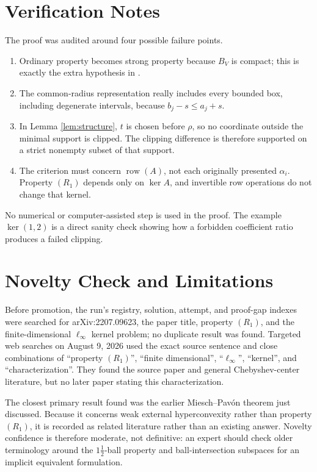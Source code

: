 \documentclass[11pt]{article}
\theoremstyle{definition}
\newcommand{\row}{\operatorname{row}}
\begin{document}
\section{Verification Notes}

The proof was audited around four possible failure points.
\begin{enumerate}
\item Ordinary property becomes strong property because \(B_V\) is compact;
      this is exactly the extra hypothesis in \cite[Theorem 1.4]{DasPaul}.
\item The common-radius representation really includes every bounded box,
      including degenerate intervals, because \(b_j-s\le a_j+s\).
\item In Lemma \ref{lem:structure}, \(t\) is chosen before \(\rho\), so no
      coordinate outside the minimal support is clipped.  The clipping
      difference is therefore supported on a strict nonempty subset of that
      support.
\item The criterion must concern \(\row(A)\), not each originally presented
      \(\alpha_i\).  Property \((R_1)\) depends only on \(\ker A\), and
      invertible row operations do not change that kernel.
\end{enumerate}
No numerical or computer-assisted step is used in the proof.  The example
\(\ker(1,2)\) is a direct sanity check showing how a forbidden coefficient
ratio produces a failed clipping.

\section{Novelty Check and Limitations}

Before promotion, the run's registry, solution, attempt, and proof-gap indexes
were searched for arXiv:2207.09623, the paper title, property \((R_1)\), and
the finite-dimensional \(\ell_\infty\) kernel problem; no duplicate result was
found.  Targeted web searches on August 9, 2026 used the exact source sentence
and close combinations of ``property \((R_1)\)'', ``finite dimensional'',
``\(\ell_\infty\)'', ``kernel'', and ``characterization''.  They found the
source paper and general Chebyshev-center literature, but no later paper
stating this characterization.

The closest primary result found was the earlier Miesch--Pav\'on theorem just
discussed.  Because it concerns weak external hyperconvexity rather than
property \((R_1)\), it is recorded as related literature rather than an
existing answer.  Novelty confidence is therefore moderate, not definitive:
an expert should check older terminology around the \(1\tfrac{1}{2}\)-ball property
and ball-intersection subspaces for an implicit equivalent formulation.
\end{document}

